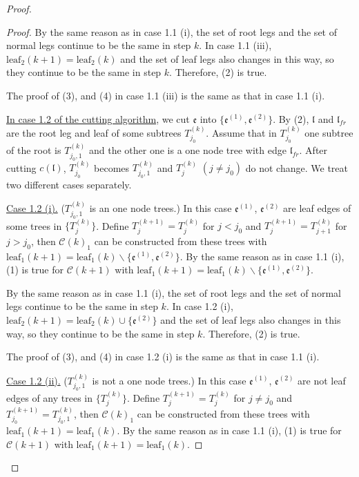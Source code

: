 \begin{proof}
\begin{proof}
By the same reason as in case 1.1 (i), the set of root legs and the set of normal legs continue to be the same in step $k$. In case 1.1 (iii), $\text{leaf}_2(k+1)=\text{leaf}_2(k)$ and the set of leaf legs also changes in this way, so they continue to be the same in step $k$. Therefore, (2) is true.

The proof of (3), and (4) in case 1.1 (iii) is the same as that in case 1.1 (i).

\underline{In case 1.2 of the cutting algorithm}, we cut $\mathfrak{e}$ into $\{\mathfrak{e}^{(1)},\mathfrak{e}^{(2)}\}$. By (2), $\mathfrak{l}$ and $\mathfrak{l}_{fr}$ are the root leg and leaf of some subtrees $T^{(k)}_{j_0}$. Assume that in $T^{(k)}_{j_0}$ one subtree of the root is $T^{(k)}_{j_0,1}$ and the other one is a one node tree with edge $\mathfrak{l}_{fr}$. After cutting $c(\mathfrak{l})$, $T^{(k)}_{j_0}$ becomes $T^{(k)}_{j_0,1}$ and $T^{(k)}_{j}$ $(j\ne j_0)$ do not change. 
We treat two different cases separately.

\underline{Case 1.2 (i).} ($T^{(k)}_{j_0,1}$ is an one node trees.) In this case $\mathfrak{e}^{(1)}$, $\mathfrak{e}^{(2)}$ are leaf edges of some trees in $\{T_{j}^{(k)}\}$. Define $T^{(k+1)}_{j}=T^{(k)}_{j}$ for $j< j_0$ and $T^{(k+1)}_{j}=T^{(k)}_{j+1}$ for $j> j_0$, then $\mathcal{C}(k)_1$ can be constructed from these trees with  $\text{leaf}_1(k+1)=\text{leaf}_1(k)\backslash\{\mathfrak{e}^{(1)}, \mathfrak{e}^{(2)}\}$. By the same reason as in case 1.1 (i), (1) is true for $\mathcal{C}(k+1)$ with $\text{leaf}_1(k+1)=\text{leaf}_1(k)\backslash\{\mathfrak{e}^{(1)}, \mathfrak{e}^{(2)}\}$.

By the same reason as in case 1.1 (i), the set of root legs and the set of normal legs continue to be the same in step $k$. In case 1.2 (i), $\text{leaf}_2(k+1)=\text{leaf}_2(k)\cup \{ \mathfrak{e}^{(2)}\}$ and the set of leaf legs also changes in this way, so they continue to be the same in step $k$. Therefore, (2) is true.

The proof of (3), and (4) in case 1.2 (i) is the same as that in case 1.1 (i).


\underline{Case 1.2 (ii).} ($T^{(k)}_{j_0,1}$ is not a one node trees.) In this case $\mathfrak{e}^{(1)}$, $\mathfrak{e}^{(2)}$ are not leaf edges of any trees in $\{T_{j}^{(k)}\}$. Define $T^{(k+1)}_{j}=T^{(k)}_{j}$ for $j\ne j_0$ and $T^{(k+1)}_{j_0}=T^{(k)}_{j_0,1}$, then $\mathcal{C}(k)_1$ can be constructed from these trees with  $\text{leaf}_1(k+1)=\text{leaf}_1(k)$. By the same reason as in case 1.1 (i), (1) is true for $\mathcal{C}(k+1)$ with $\text{leaf}_1(k+1)=\text{leaf}_1(k)$.


\end{proof}
\end{proof}
